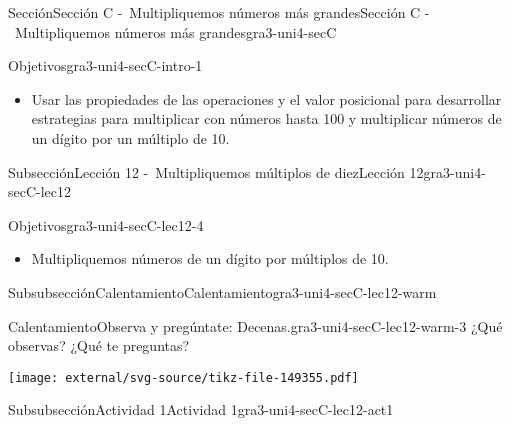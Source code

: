 \documentclass[twoside,10pt,]{article}
\begin{document}
\typeout{************************************************}
%
\begin{sectionptx}{Sección}{Sección C -~Multipliquemos números más grandes}{}{Sección C -~Multipliquemos números más grandes}{}{}{gra3-uni4-secC}
\begin{introduction}{}%
\begin{objectives}{Objetivos}{gra3-uni4-secC-intro-1}
%
\begin{itemize}[label=\textbullet]
\item{}Usar las propiedades de las operaciones y el valor posicional para desarrollar estrategias para multiplicar con números hasta 100 y multiplicar números de un dígito por un múltiplo de 10.%
\end{itemize}
\end{objectives}
\end{introduction}%
%
%
\typeout{************************************************}
\typeout{************************************************}
%
\begin{subsectionptx}{Subsección}{Lección 12 -~Multipliquemos múltiplos de diez}{}{Lección 12}{}{}{gra3-uni4-secC-lec12}
\begin{objectives}{Objetivos}{gra3-uni4-secC-lec12-4}
%
\begin{itemize}[label=\textbullet]
\item{}Multipliquemos números de un dígito por múltiplos de 10.%
\end{itemize}
\end{objectives}
%
%
\typeout{************************************************}
\typeout{************************************************}
%
\begin{subsubsectionptx}{Subsubsección}{Calentamiento}{}{Calentamiento}{}{}{gra3-uni4-secC-lec12-warm}
\begin{exploration}{Calentamiento}{Observa y pregúntate: Decenas.}{gra3-uni4-secC-lec12-warm-3}%
¿Qué observas? ¿Qué te preguntas?%
\begin{image}{0}{1}{0}{}%
\texttt{[image: external/svg-source/tikz-file-149355.pdf]}
\end{image}%
\end{exploration}%
\end{subsubsectionptx}
%
%
\typeout{************************************************}
\typeout{************************************************}
%
\begin{subsubsectionptx}{Subsubsección}{Actividad 1}{}{Actividad 1}{}{}{gra3-uni4-secC-lec12-act1}

\end{subsubsectionptx}
\end{subsectionptx}
\end{sectionptx}
\end{document}
